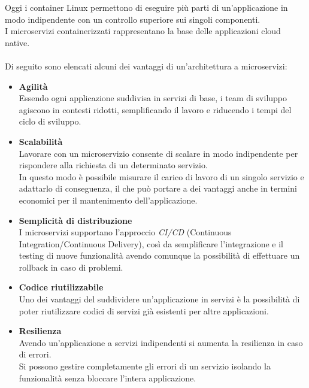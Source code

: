Oggi i container Linux permettono di eseguire più parti di un'applicazione in modo indipendente con un controllo superiore sui singoli componenti.\\
I microservizi containerizzati rappresentano la base delle applicazioni cloud native. \cite{RedHatDocker}\\ \\
Di seguito sono elencati alcuni dei vantaggi di un'architettura a microservizi:

\begin{itemize}
	\item \textbf{Agilità}\\ Essendo ogni applicazione suddivisa in servizi di base, i team di sviluppo agiscono in contesti ridotti, semplificando il lavoro e riducendo i tempi del ciclo di sviluppo.
	\item \textbf{Scalabilità}\\Lavorare con un microservizio consente di scalare in modo indipendente per rispondere alla richiesta di un determinato servizio.\\ In questo modo è possibile misurare il carico di lavoro di un singolo servizio e adattarlo di conseguenza, il che può portare a dei vantaggi anche in termini economici per il mantenimento dell'applicazione. 
	\item \textbf{Semplicità di distribuzione}\\ I microservizi supportano l'approccio \emph{CI/CD} (Continuous Integration/Continuous Delivery), così da semplificare l'integrazione e il testing di nuove funzionalità avendo comunque la possibilità di effettuare un rollback in caso di problemi.
	\item \textbf{Codice riutilizzabile}\\ Uno dei vantaggi del suddividere un'applicazione in servizi è la possibilità di poter riutilizzare codici di servizi già esistenti per altre applicazioni.
	\item \textbf{Resilienza}\\ Avendo un'applicazione a servizi indipendenti si aumenta la resilienza in caso di errori.\\ Si possono gestire completamente gli errori di un servizio isolando la funzionalità senza bloccare l'intera applicazione.
\end{itemize}

